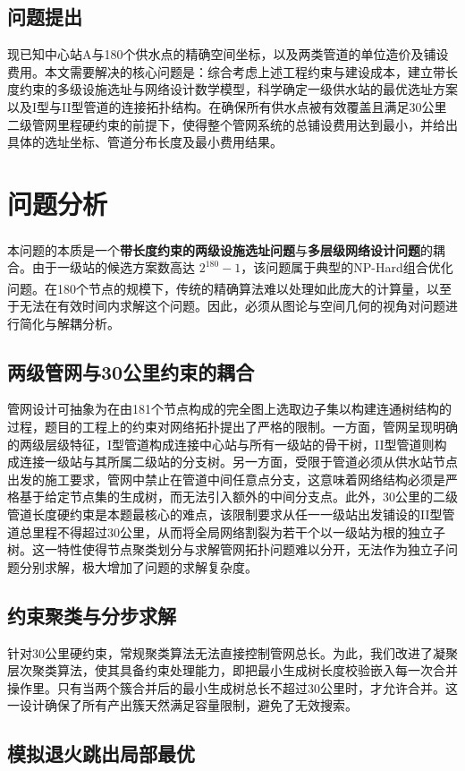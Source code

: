\documentclass[12pt,a4paper]{ctexart}
\theoremstyle{definition}
\theoremstyle{plain}
\theoremstyle{remark}
\newcommand{\supercite}[1]{\textsuperscript{\cite{#1}}}
\begin{document}
\subsection{问题提出}
现已知中心站A与180个供水点的精确空间坐标，以及两类管道的单位造价及铺设费用。本文需要解决的核心问题是：综合考虑上述工程约束与建设成本，建立带长度约束的多级设施选址与网络设计数学模型，科学确定一级供水站的最优选址方案以及I型与II型管道的连接拓扑结构。在确保所有供水点被有效覆盖且满足30公里二级管网里程硬约束的前提下，使得整个管网系统的总铺设费用达到最小，并给出具体的选址坐标、管道分布长度及最小费用结果。
\section{问题分析}
本问题的本质是一个\textbf{带长度约束的两级设施选址问题}\supercite{ref4,ref5}与\textbf{多层级网络设计问题}的耦合。由于一级站的候选方案数高达 $2^{180}-1$，该问题属于典型的NP-Hard组合优化问题\supercite{ref4}。在180个节点的规模下，传统的精确算法难以处理如此庞大的计算量，以至于无法在有效时间内求解这个问题。因此，必须从图论与空间几何的视角对问题进行简化与解耦分析。

\subsection{两级管网与30公里约束的耦合}

管网设计可抽象为在由181个节点构成的完全图上选取边子集以构建连通树结构的过程，题目的工程上的约束对网络拓扑提出了严格的限制。一方面，管网呈现明确的两级层级特征，I型管道构成连接中心站与所有一级站的骨干树，II型管道则构成连接一级站与其所属二级站的分支树。另一方面，受限于管道必须从供水站节点出发的施工要求，管网中禁止在管道中间任意点分支，这意味着网络结构必须是严格基于给定节点集的生成树，而无法引入额外的中间分支点。此外，30公里的二级管道长度硬约束是本题最核心的难点，该限制要求从任一一级站出发铺设的II型管道总里程不得超过30公里，从而将全局网络割裂为若干个以一级站为根的独立子树。这一特性使得节点聚类划分与求解管网拓扑问题难以分开，无法作为独立子问题分别求解，极大增加了问题的求解复杂度。
\subsection{约束聚类与分步求解}

针对30公里硬约束，常规聚类算法无法直接控制管网总长。为此，我们改进了凝聚层次聚类算法，使其具备约束处理能力，即把最小生成树长度校验嵌入每一次合并操作里。只有当两个簇合并后的最小生成树总长不超过30公里时，才允许合并。这一设计确保了所有产出簇天然满足容量限制，避免了无效搜索。
\subsection{模拟退火跳出局部最优}
\end{document}
